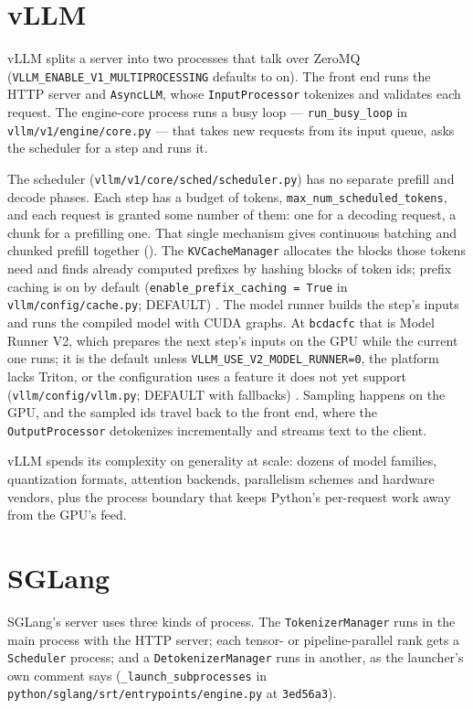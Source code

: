 \section{vLLM}

vLLM splits a server into two processes that talk over ZeroMQ
(\texttt{VLLM\_ENABLE\_V1\_MULTIPROCESSING} defaults to on). The front end runs
the HTTP server and \texttt{AsyncLLM}, whose \texttt{InputProcessor} tokenizes
and validates each request. The engine-core process runs a busy loop ---
\texttt{run\_busy\_loop} in \texttt{vllm/v1/engine/core.py} --- that takes new
requests from its input queue, asks the scheduler for a step and runs it.

The scheduler (\texttt{vllm/v1/core/sched/scheduler.py}) has no separate
prefill and decode phases. Each step has a budget of tokens,
\texttt{max\_num\_scheduled\_tokens}, and each request is granted some number of
them: one for a decoding request, a chunk for a prefilling one. That single
mechanism gives continuous batching and chunked prefill together
(). The \texttt{KVCacheManager} allocates the blocks
those tokens need and finds already computed prefixes by hashing blocks of token
ids; prefix caching is on by default (\texttt{enable\_prefix\_caching = True} in
\texttt{vllm/config/cache.py}; DEFAULT) \cite{kwon2023pagedattention,vllm2025v1}.
The model runner builds the step's inputs and runs the compiled model with CUDA
graphs. At \texttt{bcdacfc} that is Model Runner V2, which prepares the next
step's inputs on the GPU while the current one runs; it is the default unless
\texttt{VLLM\_USE\_V2\_MODEL\_RUNNER=0}, the platform lacks Triton, or the
configuration uses a feature it does not yet support (\texttt{vllm/config/vllm.py};
DEFAULT with fallbacks) \cite{vllm2026mrv2}. Sampling happens on the GPU, and the
sampled ids travel back to the front end, where the \texttt{OutputProcessor}
detokenizes incrementally and streams text to the client.

vLLM spends its complexity on generality at scale: dozens of model families,
quantization formats, attention backends, parallelism schemes and hardware
vendors, plus the process boundary that keeps Python's per-request work away
from the GPU's feed.

\section{SGLang}

SGLang's server uses three kinds of process. The \texttt{TokenizerManager}
runs in the main process with the HTTP server; each tensor- or pipeline-parallel
rank gets a \texttt{Scheduler} process; and a \texttt{DetokenizerManager} runs in
another, as the launcher's own comment says (\texttt{\_launch\_subprocesses} in
\texttt{python/sglang/srt/entrypoints/engine.py} at \texttt{3ed56a3}).

